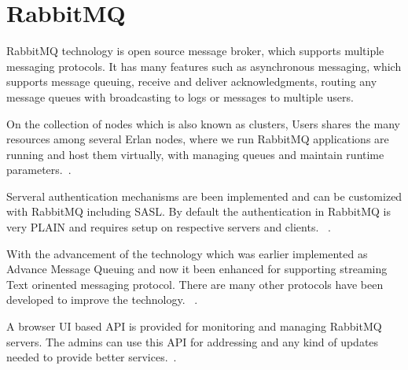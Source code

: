 \section{RabbitMQ}

RabbitMQ technology is open source message broker, which supports multiple
messaging protocols. It has many features such as asynchronous messaging,
which supports message queuing, receive and deliver acknowledgments, routing
any message queues with broadcasting to logs or messages to multiple users.

On the collection of nodes which is also known as clusters, Users shares the 
many resources among several Erlan nodes, where we run RabbitMQ applications 
are running and host them virtually, with managing queues and maintain 
runtime parameters.~\cite{hid-sp18-520-RabbitMQCluster}.

Serveral authentication mechanisms are been implemented and can be customized
with RabbitMQ including SASL. By default the authentication in RabbitMQ is
very PLAIN and requires setup on respective servers and clients.
~\cite{hid-sp18-520-RabbitMQauth}.

With the advancement of the technology which was earlier implemented as
Advance Message Queuing and now it been enhanced for supporting
streaming Text orinented messaging protocol. There are many other protocols
have been developed to improve the technology.
~\cite{hid-sp18-520-RabbitMQwiki}.

A browser UI based API is provided for monitoring and managing RabbitMQ
servers. The admins can use this API for addressing and any kind of updates 
needed to provide better services.~\cite{hid-sp18-520-RabbitMQmana}.
